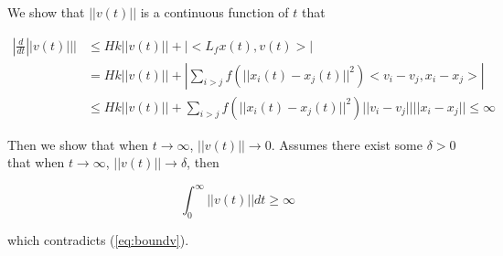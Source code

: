 \noindent
We show that $||v(t)||$ is a continuous function of $t$ that

\begin{equation}
\begin{aligned}
|\frac{d}{dt}||v(t)|||&\leq Hk||v(t)||+|<L_fx(t), v(t)>|\\
&=Hk||v(t)||+|\sum_{i>j}f(||x_i(t)-x_j(t)||^2)<v_i-v_j, x_i-x_j>|\\
&\leq Hk||v(t)||+\sum_{i>j}f(||x_i(t)-x_j(t)||^2)||v_i-v_j|| ||x_i-x_j||\leq\infty
\end{aligned}
\end{equation}

\noindent
Then we show that when $t\to\infty$, $||v(t)||\to0$. Assumes there exist some $\delta>0$ that when $t\to\infty$, $||v(t)||\to\delta$, then

\begin{equation}
\int_0^{\infty}||v(t)||dt\geq\infty
\end{equation}

\noindent
which contradicts (\ref{eq:boundv}).

\newpage
